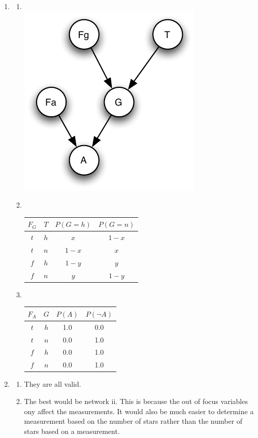 \documentclass[10pt]{article}
\begin{document}
\begin{enumerate}
\item %
  \begin{enumerate}
  \item %
    \ \\
    \includegraphics{6a_nuclear.pdf}

  \item %
    \ \\
    \begin{tabular}{|c|c|c|c|}
    \hline
    $F_G$ & $T$ & $P(G=h)$ & $P(G=n)$ \\ \hline
    $t$   & $h$ & $x$      & $1 - x$ \\
    $t$   & $n$ & $1 - x$  & $x$ \\
    $f$   & $h$ & $1 - y$  & $y$ \\
    $f$   & $n$ & $y$      & $1 - y$ \\
    \hline
    \end{tabular}

  \item %
    \ \\
    \begin{tabular}{|c|c|c|c|}
    \hline
    $F_A$ & $G$ & $P(A)$ & $P(\neg A)$ \\ \hline
    $t$   & $h$ & 1.0    & 0.0 \\
    $t$   & $n$ & 0.0    & 1.0 \\
    $f$   & $h$ & 0.0    & 1.0 \\
    $f$   & $n$ & 0.0    & 1.0 \\
    \hline
    \end{tabular}

  \end{enumerate}

\item %
  \begin{enumerate}
  \item %
    They are all valid.
    
  \item %
    The best would be network ii.  This is because the out of focus variables
    ony affect the measurements.  It would also be much easier to determine
    a measurement based on the number of stars rather than the number of
    stars based on a measurement.
  \end{enumerate}

\end{enumerate}
\end{document}
